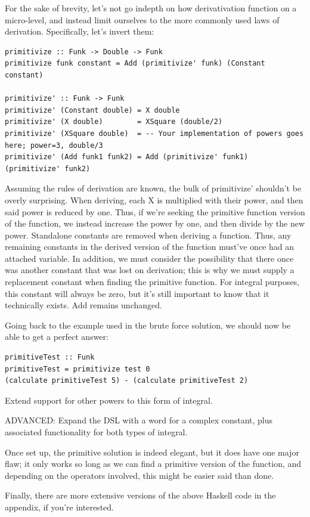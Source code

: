 For the sake of brevity, let's not go indepth on how derivativation function on a micro-level, and instead limit ourselves to the more commonly used laws of derivation. Specifically, let's invert them:

\begin{verbatim}
primitivize :: Funk -> Double -> Funk
primitivize funk constant = Add (primitivize' funk) (Constant constant)

primitivize' :: Funk -> Funk
primitivize' (Constant double) = X double
primitivize' (X double)        = XSquare (double/2)
primitivize' (XSquare double)  = -- Your implementation of powers goes here; power=3, double/3
primitivize' (Add funk1 funk2) = Add (primitivize' funk1) (primitivize' funk2)
\end{verbatim}

Assuming the rules of derivation are known, the bulk of primitivize' shouldn't be overly surprising.
When deriving, each X is multiplied with their power, and then said power is reduced by one. Thus, if we're seeking the primitive function version of the function, we instead increase the power by one, and then divide by the new power.
Standalone constants are removed when deriving a function. Thus, any remaining constants in the derived version of the function must've once had an attached variable.
In addition, we must consider the possibility that there once was another constant that was lost on derivation; this is why we must supply a replacement constant when finding the primitive function. For integral purposes, this constant will always be zero, but it's still important to know that it technically exists.
Add remains unchanged.

Going back to the example used in the brute force solution, we should now be able to get a perfect answer:
\begin{verbatim}
primitiveTest :: Funk
primitiveTest = primitivize test 0
(calculate primitiveTest 5) - (calculate primitiveTest 2)
\end{verbatim}

\begin{exercise}
Extend support for other powers to this form of integral.
\end{exercise}
\begin{exercise}
ADVANCED: Expand the DSL with a word for a complex constant, plus associated functionality for both types of integral.
\end{exercise}

Once set up, the primitive solution is indeed elegant, but it does have one major flaw; it only works so long as we can find a primitive version of the function, and depending on the operators involved, this might be easier said than done.

Finally, there are more extensive versions of the above Haskell code in the appendix, if you're interested.